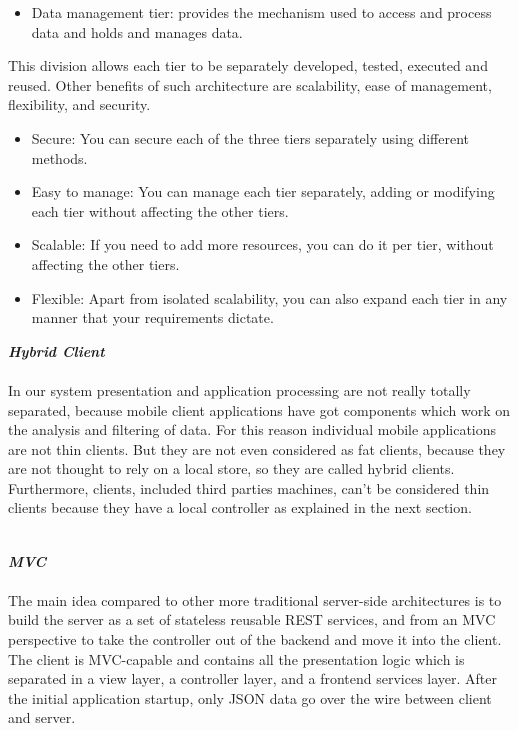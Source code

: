 \begin{legal}
\begin{legal}
\begin{itemize}
					\item Data management tier: provides the mechanism used to access and process data and holds and manages data.
				\end{itemize}
				 This division allows each tier to be separately developed, tested, executed and reused. Other benefits of such architecture are scalability, ease of management, flexibility, and security.
				\begin{itemize}
					\item Secure: You can secure each of the three tiers separately using different methods.
					\item Easy to manage: You can manage each tier separately, adding or modifying each tier without affecting the other tiers.
					\item Scalable: If you need to add more resources, you can do it per tier, without affecting the other tiers.
					\item Flexible: Apart from isolated scalability, you can also expand each tier in any manner that your requirements dictate.\\
				\end{itemize}
				\item \textit{\textbf{Hybrid Client}}\\\\
				In our system presentation and application processing are not really totally separated, because mobile client applications have got components which work on the analysis and filtering of data. For this reason individual mobile applications are not thin clients. But they are not even considered as fat clients, because they are not thought to rely on a local store, so they are called hybrid clients. Furthermore, clients, included third parties machines, can't be considered thin clients because they have a local controller as explained in the next section.\\\\
				\item \textit{\textbf{MVC}}\\\\
				The main idea compared to other more traditional server-side architectures is to build the server as a set of stateless reusable REST services, and from an MVC perspective to take the controller out of the backend and move it into the client.
				The client is MVC-capable and contains all the presentation logic which is separated in a view layer, a controller layer, and a frontend services layer. After the initial application startup, only JSON data go over the wire between client and server.

\end{legal}
\end{legal}
